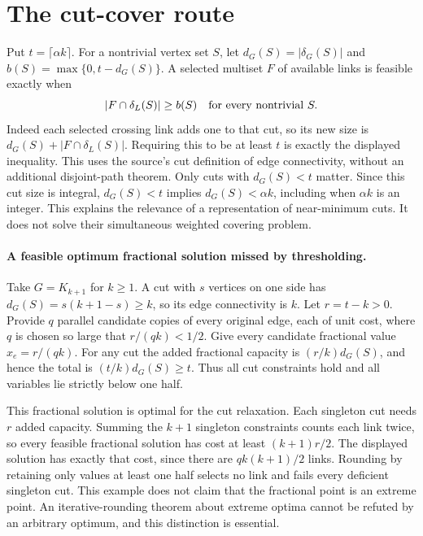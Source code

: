 \documentclass[11pt]{article}
\begin{document}
\section{The cut-cover route}
Put $t=\lceil\alpha k\rceil$. For a nontrivial vertex set
$S$, let $d_G(S)=|\delta_G(S)|$ and
$b(S)=\max\{0,t-d_G(S)\}$. A selected multiset $F$ of
available links is feasible exactly when
\[
|F\cap\delta_L(S)|\ge b(S)\quad\hbox{for every nontrivial }S.
\]
Indeed each selected crossing link adds one to that cut, so its
new size is $d_G(S)+|F\cap\delta_L(S)|$. Requiring this
to be at least $t$ is exactly the displayed inequality. This
uses the source's cut definition of edge connectivity, without an
additional disjoint-path theorem. Only cuts with $d_G(S)<t$
matter. Since this cut size is integral, $d_G(S)<t$ implies
$d_G(S)<\alpha k$, including when $\alpha k$ is an integer.
This explains the relevance of a representation of near-minimum cuts.
It does not solve their simultaneous weighted covering problem.

\paragraph{A feasible optimum fractional solution missed by thresholding.}
Take $G=K_{k+1}$ for $k\ge1$. A cut with $s$ vertices
on one side has $d_G(S)=s(k+1-s)\ge k$, so its edge
connectivity is $k$. Let $r=t-k>0$. Provide $q$ parallel
candidate copies of every original edge, each of unit cost, where
$q$ is chosen so large that $r/(qk)<1/2$. Give every
candidate fractional value $x_e=r/(qk)$. For any cut the
added fractional capacity is $(r/k)d_G(S)$, and hence the
total is $(t/k)d_G(S)\ge t$. Thus all cut constraints
hold and all variables lie strictly below one half.

This fractional solution is optimal for the cut relaxation. Each
singleton cut needs $r$ added capacity. Summing the $k+1$
singleton constraints counts each link twice, so every feasible
fractional solution has cost at least $(k+1)r/2$. The displayed
solution has exactly that cost, since there are $qk(k+1)/2$
links. Rounding by retaining only values at least one half selects
no link and fails every deficient singleton cut. This example
does not claim that the fractional point is an extreme point.
An iterative-rounding theorem about extreme optima cannot be refuted
by an arbitrary optimum, and this distinction is essential.
\end{document}
